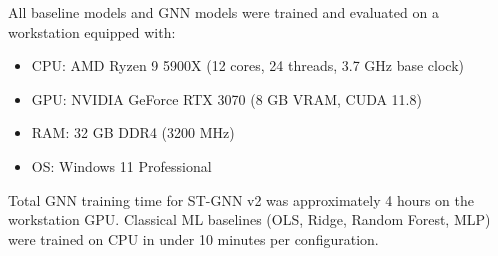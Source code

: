 \documentclass[10pt,twocolumn]{article}
\begin{document}
All baseline models and GNN models were trained and evaluated on a workstation equipped with:
\begin{itemize}
    \item CPU: AMD Ryzen 9 5900X (12 cores, 24 threads, 3.7 GHz base clock)
    \item GPU: NVIDIA GeForce RTX 3070 (8 GB VRAM, CUDA 11.8)
    \item RAM: 32 GB DDR4 (3200 MHz)
    \item OS: Windows 11 Professional
\end{itemize}

Total GNN training time for ST-GNN v2 was approximately 4 hours on the workstation GPU. Classical ML baselines (OLS, Ridge, Random Forest, MLP) were trained on CPU in under 10 minutes per configuration.

\small


\end{document}
